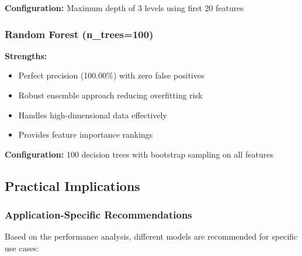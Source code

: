 \textbf{Configuration:} Maximum depth of 3 levels using first 20 features

\subsubsection{Random Forest (n\_trees=100)}

\textbf{Strengths:}
\begin{itemize}
    \item Perfect precision (100.00\%) with zero false positives
    \item Robust ensemble approach reducing overfitting risk
    \item Handles high-dimensional data effectively
    \item Provides feature importance rankings
\end{itemize}

\textbf{Configuration:} 100 decision trees with bootstrap sampling on all features

\subsection{Practical Implications}

\subsubsection{Application-Specific Recommendations}

Based on the performance analysis, different models are recommended for specific use cases:

